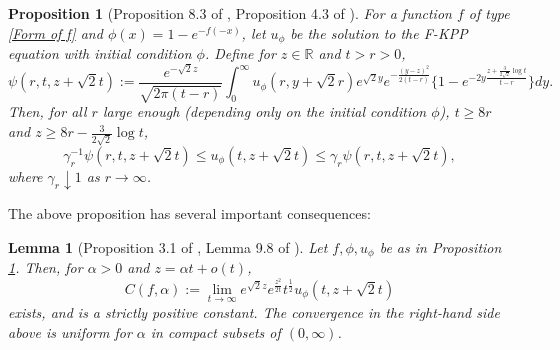 \documentclass[a4paper,reqno]{amsart}%
\newcommand{\1}{\mathbf 1}
\theoremstyle{mine}
\numberwithin{theorem}{section}
\newtheorem{proposition}[theorem]{Proposition}
\newtheorem{lemma}[theorem]{Lemma}
\numberwithin{equation}{section}
\theoremstyle{remark}
\begin{document}
\begin{proposition}[Proposition 8.3 of \cite{Bramson83}, Proposition 4.3 of \cite{ABK13}]\label{Bramson-psi-estimate-for-one-sided-f}
For a function $f$ of type \eqref{Form of f} and $\phi(x) = 1-e^{-f(-x)}$, let $u_{\phi}$ be the solution to the F-KPP equation with initial condition $\phi$. Define for $z\in \mathbb R$ and $t>r>0$,
\begin{equation}
\psi(r,t,z+\sqrt 2t):=\frac{e^{-\sqrt 2z}}{\sqrt{2\pi(t-r)}}\int_0^\infty u_{\phi}(r,y+\sqrt 2r)e^{\sqrt 2y}e^{-\frac{(y-z)^2}{2(t-r)}}\{1-e^{-2y\frac{z+\frac{3}{2\sqrt 2}\log t}{t-r}}\}dy.
\end{equation}
Then, for all $r$ large enough (depending only on the initial condition $\phi$), $t\geq 8r$ and $z \geq 8r-\frac{3}{2\sqrt 2}\log t$,
\begin{equation}
\gamma_r^{-1} \psi(r,t,z+\sqrt 2t) \le u_{\phi}(t,z+\sqrt 2 t) \le \gamma_r \psi(r,t,z+\sqrt 2t),
\end{equation}
where $\gamma_r \downarrow 1$ as $r\to \infty$.
\end{proposition}

The above proposition has several important consequences: 

\begin{lemma}[Proposition 3.1 of \cite{bovier2014extremal}, Lemma 9.8 of \cite{Bovier_book}]\label{C(a) definition}
Let $f, \phi, u_\phi$ be as in Proposition \ref{Bramson-psi-estimate-for-one-sided-f}. Then, for $\alpha>0$ and $z= \alpha t+o(t)$,
\begin{equation}\label{C(a)}
C(f, \alpha) :=\lim_{t \to \infty} e^{\sqrt 2z} e^{\frac{z^2}{2t}}t^{\frac{1}{2}}u_{\phi}(t,z+\sqrt 2 t)
\end{equation}
exists, and is a strictly positive constant. The convergence in the right-hand side above is uniform for $\alpha$ in compact subsets of $(0,\infty)$. 
\end{lemma}
\end{document}

